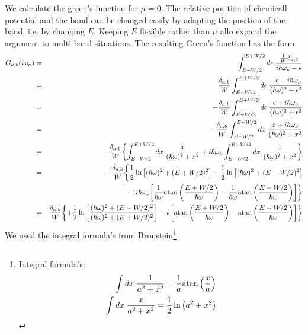 \documentclass[11pt,a4paper]{report}
\begin{document}
We calculate the green's function for $\mu=0$. The relative position
of chemicall potential and the band can be changed easily by adapting
the position of the band, i.e. by changing $E$. Keeping $E$ flexible
rather than $\mu$ allo expand the argument to multi-band situations.
The resulting Green's function has the form
\begin{eqnarray}
G_{a,b}(i\omega_\nu)&=&\int_{E-W/2}^{E+W/2} d\epsilon\;
\frac{\frac{1}{W}\delta_{a,b}}{i\hbar\omega_\nu-\epsilon}
\nonumber\\
&=&
\frac{\delta_{a,b}}{W}\int_{E-W/2}^{E+W/2}d\epsilon\;
\frac{-\epsilon-i\hbar\omega_\nu}{(\hbar\omega)^2+\epsilon^2}
\nonumber\\
&=&
-\frac{\delta_{a,b}}{W}\int_{E-W/2}^{E+W/2}d\epsilon\;
\frac{\epsilon+i\hbar\omega_\nu}{(\hbar\omega)^2+\epsilon^2}
\nonumber\\
&=&
-\frac{\delta_{a,b}}{W}\int_{E-W/2}^{E+W/2}dx\;
\frac{x+i\hbar\omega_\nu}{(\hbar\omega)^2+x^2}
\nonumber\\
&=&
-\frac{\delta_{a,b}}{W}
\biggl\lbrace
\int_{E-W/2}^{E+W/2}dx\;
\frac{x}{(\hbar\omega)^2+x^2}
+i\hbar\omega_\nu\int_{E-W/2}^{E+W/2}dx\;
\frac{1}{(\hbar\omega)^2+x^2}
\biggr\rbrace
\nonumber\\
&=&
-\frac{\delta_{a,b}}{W}
\biggl\lbrace
\frac{1}{2}\ln\left[(\hbar\omega)^2+(E+W/2)^2\right]
-\frac{1}{2}\ln\left[(\hbar\omega)^2+(E-W/2)^2\right]
\nonumber\\
&&\hspace{1cm}
 +i\hbar\omega_\nu 
\biggl[
 \frac{1}{\hbar\omega}{\rm atan}\left(\frac{E+W/2}{\hbar\omega}\right)
-\frac{1}{\hbar\omega}{\rm atan}\left(\frac{E-W/2}{\hbar\omega}\right)
\biggr]
\biggr\rbrace
\nonumber\\
&=&
\frac{\delta_{a,b}}{W}
\biggl\lbrace
+\frac{1}{2}\ln\left[
\frac{(\hbar\omega)^2+(E-W/2)^2}{(\hbar\omega)^2+(E+W/2)^2}
\right]
-i \left[{\rm atan}\left(\frac{E+W/2}{\hbar\omega}\right)
-{\rm atan}\left(\frac{E-W/2}{\hbar\omega}\right)\right]
\biggr\rbrace
\nonumber\\
\end{eqnarray}
We used the integral formula's from Bronstein\footnote{Integral formula's:
\begin{eqnarray}
\int dx\;\frac{1}{a^2+x^2}=\frac{1}{a}{\rm atan}\left(\frac{x}{a}\right)
\nonumber\\
\int dx\;\frac{x}{a^2+x^2}=\frac{1}{2}\ln\left(a^2+x^2\right)
\end{eqnarray}
}
\end{document}
